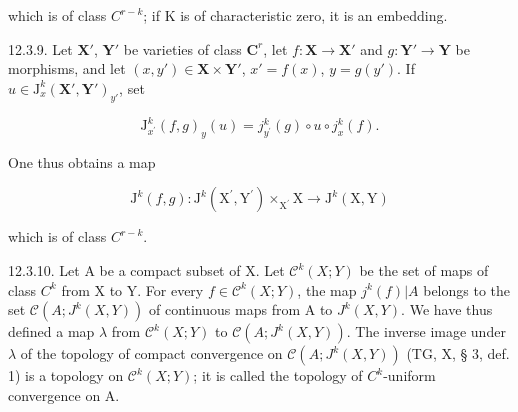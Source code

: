 which is of class \(C^{r-k}\); if K is of characteristic zero, it is an embedding.

12.3.9. Let \(\mathbf{X}'\), \(\mathbf{Y}'\) be varieties of class \(\mathbf{C}^r\), let \(f: \mathbf{X} \to \mathbf{X}'\) and \(g: \mathbf{Y}' \to \mathbf{Y}\) be morphisms, and let \((x, y') \in \mathbf{X} \times \mathbf{Y}'\), \(x' = f(x)\), \(y = g(y')\). If \(u \in \mathrm{J}_x^k(\mathbf{X}', \mathbf{Y}')_{y'}\), set

\[
\mathrm{J} _ {x ^ {\prime}} ^ {k} (f, g) _ {y} (u) = j _ {y ^ {\prime}} ^ {k} (g) \circ u \circ j _ {x} ^ {k} (f).
\]

One thus obtains a map

\[
\mathrm{J} ^ {k} (f, g) \colon \mathrm{J} ^ {k} (\mathrm{X} ^ {\prime}, \mathrm{Y} ^ {\prime}) \times_ {\mathrm{X} ^ {\prime}} \mathrm{X} \rightarrow \mathrm{J} ^ {k} (\mathrm{X}, \mathrm{Y})
\]

which is of class \(C^{r-k}\).

12.3.10. Let A be a compact subset of X. Let \(\mathcal{C}^{k}(X;Y)\) be the set of maps of class \(C^{k}\) from X to Y. For every \(f\in\mathcal{C}^{k}(X;Y)\), the map \(j^{k}(f)|A\) belongs to the set \(\mathcal{C}(A;J^{k}(X,Y))\) of continuous maps from A to \(J^{k}(X,Y)\). We have thus defined a map \(\lambda\) from \(\mathcal{C}^{k}(X;Y)\) to \(\mathcal{C}(A;J^{k}(X,Y))\). The inverse image under \(\lambda\) of the topology of compact convergence on \(\mathcal{C}(A;J^{k}(X,Y))\) (TG, X, § 3, def. 1) is a topology on \(\mathcal{C}^{k}(X;Y)\); it is called the topology of \(C^{k}\)-uniform convergence on A.

